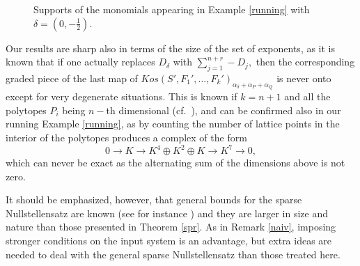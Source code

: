 \documentclass[a4paper,11pt]{amsart}
\numberwithin{thm}{section}
\numberwithin{equation}{section}
\theoremstyle{definition}
\theoremstyle{plain}
\begin{document}
\begin{figure}[ht]
\medskip
{} \hspace{5mm}
 \hspace{5mm}
   \caption{Supports of the monomials appearing in Example  \ref{running} with $\delta=(0,-\frac12)$.}  \label{fig01}
\end{figure}



Our results are sharp also in terms of the size of the set of exponents, as it is known that  if one actually replaces $D_\delta$ with $\sum_{j=1}^{n+r} -D_j,$ then the corresponding graded piece of the last map of $Kos(S',F_1',\ldots, F_k')_{\alpha_\delta+\alpha_P+\alpha_Q}$ is never onto except for very degenerate situations. This is known if $k=n+1$  and all the polytopes $P_i$ being $n-$th dimensional (cf.~\cite{CD05}), and can be confirmed also in our running Example \ref{running}, as by counting the number of lattice points in the interior of the polytopes produces a complex  of the form
$$ 0\to K\to K^4\oplus K^2\oplus K\to K^7\to0,
$$
which can never be exact as the alternating sum of the dimensions above is not zero.



It should be emphasized, however, that general bounds for the sparse Nullstellensatz are known (see for instance \cite{som99}) and they are larger in size and nature than those presented in Theorem \ref{spr}. As in Remark \ref{naiv}, imposing stronger conditions on the input system is an advantage, but extra ideas are needed to deal with the general sparse Nullstellensatz than those treated here.
\end{document}
